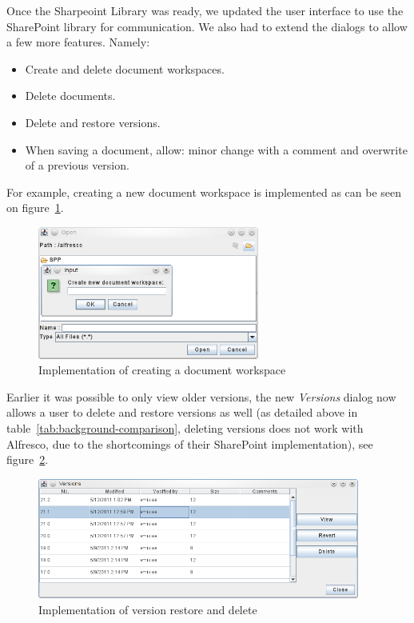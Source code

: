 Once the Sharpeoint Library was ready, we updated the user interface to use the
SharePoint library for communication. We also had to extend the dialogs to allow
a few more features. Namely:

\begin{itemize}
\item Create and delete document workspaces.
\item Delete documents.
\item Delete and restore versions.
\item When saving a document, allow: minor change with a comment and overwrite of a previous version.
\end{itemize}

For example, creating a new document workspace is implemented as can be seen on
figure~\ref{fig:implementation-createdws}.

\begin{figure}[H]
\centering
\includegraphics[width=275px,keepaspectratio]{implementation-createdws.png}
\caption{Implementation of creating a document workspace}
\label{fig:implementation-createdws}
\end{figure}

Earlier it was possible to only view older versions, the new \emph{Versions}
dialog now allows a user to delete and restore versions as well (as detailed
above in table~\ref{tab:background-comparison}, deleting versions does not work
with Alfresco, due to the shortcomings of their SharePoint implementation), see
figure~\ref{fig:implementation-versiondialog}.

\begin{figure}[H]
\centering
\includegraphics[width=400px,keepaspectratio]{implementation-versiondialog.png}
\caption{Implementation of version restore and delete}
\label{fig:implementation-versiondialog}
\end{figure}


